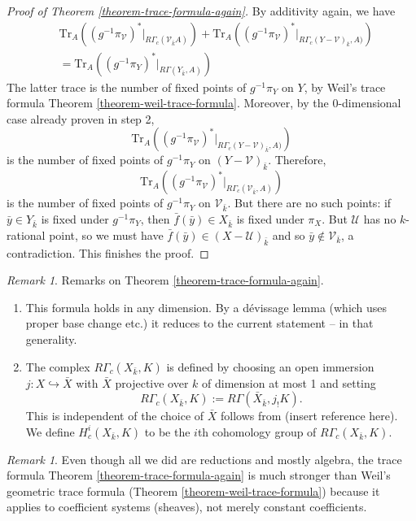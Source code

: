 \documentclass{stacks-project}
\theoremstyle{plain}
\theoremstyle{definition}
\theoremstyle{remark}
\newtheorem{remark}[subsection]{Remark}
\numberwithin{equation}{subsection}
\begin{document}
\begin{proof}[Proof of Theorem \ref{theorem-trace-formula-again}]
\medskip\noindent
By additivity again, we have
\begin{eqnarray*}
& \text{Tr}_A((g^{-1}\pi_\mathcal{V})^* |_{R\Gamma_c(\mathcal{V}_{\bar k} A)})
+
\text{Tr}_A((g^{-1}\pi_\mathcal{V})^*
|_{R\Gamma_c(Y-\mathcal {V})_{\bar k}, A)}) \\
& =
\text{Tr}_A((g^{-1}\pi_Y)^* |_{R\Gamma(Y_{\bar k}, A)})
\end{eqnarray*}
The latter trace is the number of fixed points of $g^{-1}\pi_Y$ on $Y$, by
Weil's trace formula
Theorem \ref{theorem-weil-trace-formula}.
Moreover, by the 0-dimensional case already proven in step 2,
$$
\text{Tr}_A((g^{-1}\pi_\mathcal{V})^*|_{R\Gamma_c(Y-\mathcal{V})_{\bar k}, A)})
$$
is the number of fixed points of $g^{-1}\pi_Y$ on $(Y-\mathcal{V})_{\bar k}$.
Therefore,
$$
\text{Tr}_A((g^{-1}\pi_\mathcal{V})^* |_{R\Gamma_c(\mathcal{V}_{\bar k}, A)})
$$
is the number of fixed points of $g^{-1}\pi_Y$ on $\mathcal{V}_{\bar k}$. But
there are no such points: if $\bar y\in Y_{\bar k}$ is fixed under
$g^{-1}\pi_Y$, then $\bar f(\bar y) \in X_{\bar k}$ is fixed under $\pi_X$. But
$\mathcal{U}$ has no $k$-rational point, so we must have $\bar f(\bar y)\in
(X-\mathcal{U})_{\bar k}$ and so $\bar y\notin \mathcal{V}_{\bar k}$, a
contradiction.
This finishes the proof.
\end{proof}

\begin{remark}
\label{remark-on-trace-formula-again}
Remarks on Theorem \ref{theorem-trace-formula-again}.
\begin{enumerate}
\item
This formula holds in any dimension. By a d\'evissage lemma (which uses proper
base change etc.) it reduces to the current statement -- in that generality.
\item
The complex $R\Gamma_c(X_{\bar k}, K)$ is defined by choosing an open immersion
$j : X \hookrightarrow \bar X$ with $\bar X$ projective over $k$ of dimension at
most 1 and setting
$$
R\Gamma_c(X_{\bar k}, K) := R\Gamma(\bar X_{\bar k}, j_!K).
$$
This is independent of the choice of $\bar X$ follows from
(insert reference here). We define $H^i_c(X_{\bar k}, K)$
to be the $i$th cohomology group of $R\Gamma_c(X_{\bar k}, K)$.
\end{enumerate}
\end{remark}

\begin{remark}
\label{remark-stronger}
Even though all we did are reductions and mostly algebra, the trace formula
Theorem \ref{theorem-trace-formula-again} is much stronger than
Weil's geometric trace formula (Theorem \ref{theorem-weil-trace-formula})
because it applies to coefficient
systems (sheaves), not merely constant coefficients.
\end{remark}
\end{document}
